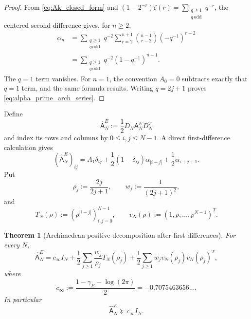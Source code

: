 \documentclass[11pt]{amsart}
\numberwithin{equation}{section}
\theoremstyle{plain}
\newtheorem{theorem}{Theorem}[section]
\theoremstyle{definition}
\theoremstyle{remark}
\begin{document}
\begin{proof}
From \eqref{eq:Ak_closed_form} and
$(1-2^{-r})\zeta(r)=\sum_{\substack{q\ge1\\ q\,\mathrm{odd}}}q^{-r}$, the centered second difference gives, for $n\ge2$,
\begin{align*}
 \alpha_n
 &=\sum_{\substack{q\ge1\\q\,\mathrm{odd}}}
 q^{-2}\sum_{r=2}^{n+1}
 \binom{n-1}{r-2}(-q^{-1})^{r-2}\\
 &=\sum_{\substack{q\ge1\\q\,\mathrm{odd}}}
 q^{-2}(1-q^{-1})^{n-1}.
\end{align*}
The $q=1$ term vanishes.  For $n=1$, the convention $A_0=0$ subtracts exactly that $q=1$ term, and the same formula results.  Writing $q=2j+1$ proves
\eqref{eq:alpha_prime_arch_series}.
\end{proof}

Define
\begin{equation}
 \widehat{\mathsf A}_N^E
 :=\frac12D_N\mathsf A_N^ED_N^T
 \label{eq:Ahat_prime_arch}
\end{equation}
and index its rows and columns by $0\le i,j\le N-1$.  A direct first-difference calculation gives
\begin{equation}
 (\widehat{\mathsf A}_N^E)_{ij}
 =A_1\delta_{ij}
 +\frac12(1-\delta_{ij})\alpha_{|i-j|}
 +\frac12\alpha_{i+j+1}.
 \label{eq:Ahat_alpha_toeplitz_hankel}
\end{equation}
Put
\begin{equation}
 \rho_j:=\frac{2j}{2j+1},
 \qquad
 w_j:=\frac1{(2j+1)^2},
 \label{eq:rho_w_prime_arch}
\end{equation}
and
\begin{equation}
 T_N(\rho):=(\rho^{|i-j|})_{i,j=0}^{N-1},
 \qquad
 v_N(\rho):=(1,\rho,\ldots,\rho^{N-1})^T.
 \label{eq:TN_vN_prime_arch}
\end{equation}

\begin{theorem}[Archimedean positive decomposition after first differences]
\label{thm:arch_prime_positive_decomposition}
For every $N$,
\begin{equation}
 \boxed{
 \widehat{\mathsf A}_N^E
 =c_\infty I_N
 +\frac12\sum_{j\ge1}\frac{w_j}{\rho_j}T_N(\rho_j)
 +\frac12\sum_{j\ge1}w_jv_N(\rho_j)v_N(\rho_j)^T,}
 \label{eq:arch_prime_positive_decomposition}
\end{equation}
where
\begin{equation}
 c_\infty
 :=\frac{1-\gamma_E-\log(2\pi)}2
 =-0.7075463656\ldots.
 \label{eq:c_infty_prime_arch}
\end{equation}
In particular
\begin{equation}
 \widehat{\mathsf A}_N^E\succeq c_\infty I_N.
 \label{eq:Ahat_prime_arch_lower}
\end{equation}
\end{theorem}
\end{document}
